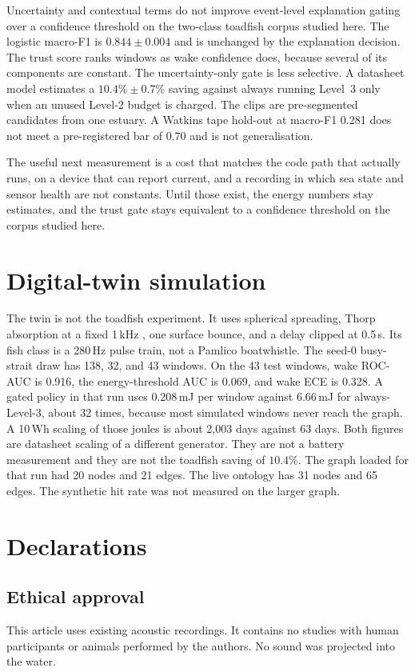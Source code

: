 \documentclass[sn-mathphys-num]{sn-jnl}%
\theoremstyle{thmstyleone}%
\theoremstyle{thmstyletwo}%
\theoremstyle{thmstylethree}%
\begin{document}
Uncertainty and contextual terms do not improve event-level explanation gating over a confidence threshold on the two-class toadfish corpus studied here. The logistic macro-F1 is $0.844 \pm 0.004$ and is unchanged by the explanation decision. The trust score ranks windows as wake confidence does, because several of its components are constant. The uncertainty-only gate is less selective. A datasheet model estimates a $10.4\% \pm 0.7\%$ saving against always running Level~3 only when an unused Level-2 budget is charged. The clips are pre-segmented candidates from one estuary. A Watkins tape hold-out at macro-F1 0.281 does not meet a pre-registered bar of 0.70 and is not generalisation.

The useful next measurement is a cost that matches the code path that actually runs, on a device that can report current, and a recording in which sea state and sensor health are not constants. Until those exist, the energy numbers stay estimates, and the trust gate stays equivalent to a confidence threshold on the corpus studied here.

\appendix
\section{Digital-twin simulation}\label{app:twin}

The twin is not the toadfish experiment. It uses spherical spreading, Thorp absorption at a fixed 1\,kHz \cite{thorp1967}, one surface bounce, and a delay clipped at 0.5\,s. Its fish class is a 280\,Hz pulse train, not a Pamlico boatwhistle. The seed-0 busy-strait draw has 138, 32, and 43 windows. On the 43 test windows, wake ROC-AUC is 0.916, the energy-threshold AUC is 0.069, and wake ECE is 0.328. A gated policy in that run uses 0.208\,mJ per window against 6.66\,mJ for always-Level-3, about 32 times, because most simulated windows never reach the graph. A 10\,Wh scaling of those joules is about 2{,}003 days against 63 days. Both figures are datasheet scaling of a different generator. They are not a battery measurement and they are not the toadfish saving of $10.4\%$. The graph loaded for that run had 20 nodes and 21 edges. The live ontology has 31 nodes and 65 edges. The synthetic hit rate was not measured on the larger graph.

\section*{Declarations}

\subsection*{Ethical approval}
This article uses existing acoustic recordings. It contains no studies with human participants or animals performed by the authors. No sound was projected into the water.
\end{document}
